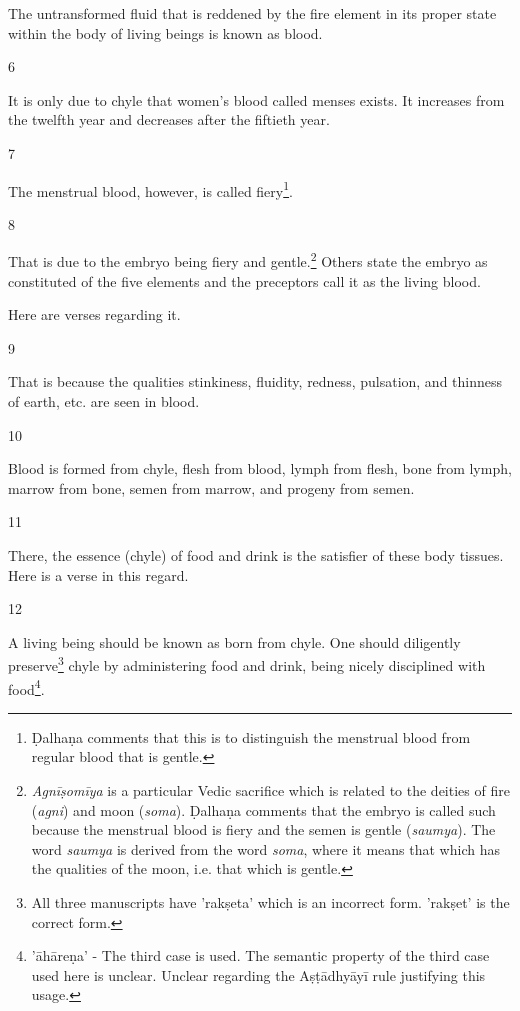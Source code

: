 \begin{translation}
The untransformed fluid that is reddened by the fire element in its proper state within the body of living beings is known as blood. %

\item [6]

It is only due to chyle that women's blood called menses exists. It increases from the twelfth year and decreases after the fiftieth year. 


\item [7]

The menstrual blood, however, is called fiery\footnote{Ḍalhaṇa comments that this is to distinguish the menstrual blood from regular blood that is gentle.}.  

\item [8]

That is due to the embryo being fiery and gentle.\footnote{\emph{Agnīṣomīya} is a particular Vedic sacrifice which is related to the deities of fire (\emph{agni}) and moon (\emph{soma}). Ḍalhaṇa comments that the embryo is called such because the menstrual blood is fiery and the semen is gentle (\emph{saumya}). The word \emph{saumya} is derived from the word \emph{soma}, where it means that which has the qualities of the moon, i.e. that which is gentle.}
Others state the embryo as constituted of the five elements and the preceptors call it as the living blood. 

Here are verses regarding it.

\item [9]

That is because the qualities stinkiness, fluidity, redness, pulsation, and thinness of earth, etc. are seen in blood.

\item [10]

Blood is formed from chyle, flesh from blood, lymph from flesh, bone from lymph, marrow from bone, semen from marrow, and progeny from semen. 

\item [11]

There, the essence (chyle) of food and drink is the satisfier of these body tissues.
Here is a verse in this regard.

\item[12]

A living being should be known as born from chyle. One should diligently preserve\footnote{All three manuscripts have 'rakṣeta' which is an incorrect form. 'rakṣet' is the correct form.} chyle by administering food and drink, being nicely disciplined with food\footnote{'āhāreṇa' - The third case is used. The semantic property of the third case used here is unclear. Unclear regarding the Aṣṭādhyāyī rule justifying this usage.}.


\end{translation}
